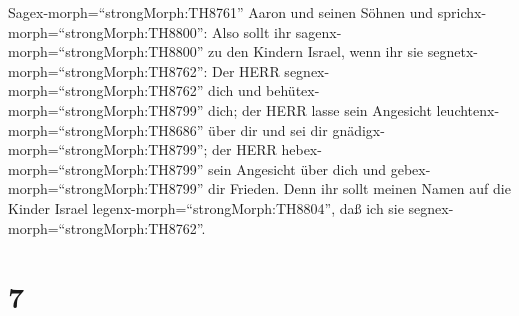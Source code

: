 Sagex-morph=``strongMorph:TH8761'' Aaron und seinen Söhnen und
sprichx-morph=``strongMorph:TH8800'': Also sollt ihr
sagenx-morph=``strongMorph:TH8800'' zu den Kindern Israel, wenn ihr sie
segnetx-morph=``strongMorph:TH8762'':  Der HERR
segnex-morph=``strongMorph:TH8762'' dich und
behütex-morph=``strongMorph:TH8799'' dich;  der HERR lasse
sein Angesicht leuchtenx-morph=``strongMorph:TH8686'' über dir und sei
dir gnädigx-morph=``strongMorph:TH8799'';  der HERR
hebex-morph=``strongMorph:TH8799'' sein Angesicht über dich und
gebex-morph=``strongMorph:TH8799'' dir Frieden.  Denn ihr
sollt meinen Namen auf die Kinder Israel
legenx-morph=``strongMorph:TH8804'', daß ich sie
segnex-morph=``strongMorph:TH8762''.

\hypertarget{section-6}{%
\section{7}\label{section-6}}

